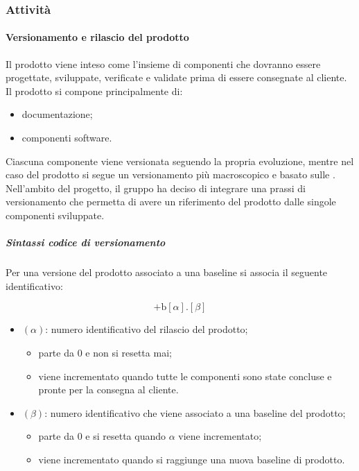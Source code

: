 \subsubsection{Attività}

	\paragraph{Versionamento e rilascio del prodotto}

	Il prodotto viene inteso come l'insieme di componenti che dovranno essere progettate, sviluppate, verificate e validate prima di essere consegnate al cliente. Il prodotto si compone principalmente di:
	\begin{itemize}
		\item documentazione;
		\item componenti software.
	\end{itemize}

	Ciascuna componente viene versionata seguendo la propria evoluzione, mentre nel caso del prodotto si segue un versionamento più macroscopico e basato sulle .
	Nell'ambito del progetto, il gruppo ha deciso di integrare una prassi di versionamento che permetta di avere un riferimento del prodotto dalle singole componenti sviluppate.

		\subparagraph{Sintassi codice di versionamento}

		Per una versione del prodotto associato a una baseline si associa il seguente identificativo:

		\[%
			\text{+b}[\alpha].[\beta]
		\]

		\begin{itemize}
			\item \((\alpha)\): numero identificativo del rilascio del prodotto;
			\begin{itemize}
				\item parte da 0 e non si resetta mai;
				\item viene incrementato quando tutte le componenti sono state concluse e pronte per la consegna al cliente.
			\end{itemize}
			\item \((\beta)\): numero identificativo che viene associato a una baseline del prodotto;
			\begin{itemize}
	  			\item parte da 0 e si resetta quando \(\alpha\) viene incrementato;
				\item viene incrementato quando si raggiunge una nuova baseline di prodotto. 
			\end{itemize}
		\end{itemize}


